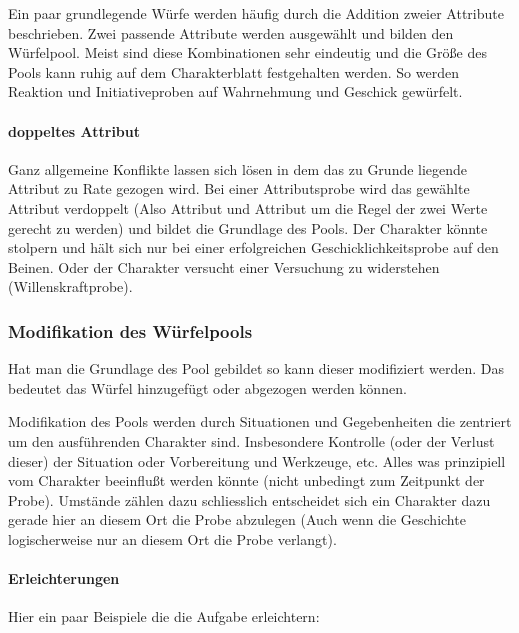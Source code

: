 \documentclass{article}
\begin{document}
Ein paar grundlegende Würfe werden häufig durch die Addition zweier Attribute beschrieben. Zwei passende Attribute
werden ausgewählt und bilden den Würfelpool. Meist sind diese Kombinationen sehr eindeutig und die Größe des Pools
kann ruhig auf dem Charakterblatt festgehalten werden. So werden Reaktion und Initiativeproben auf Wahrnehmung und
Geschick gewürfelt.

\paragraph{doppeltes Attribut}

Ganz allgemeine Konflikte lassen sich lösen in dem das zu Grunde liegende Attribut zu Rate gezogen wird. Bei einer
Attributsprobe wird das gewählte Attribut verdoppelt (Also Attribut und Attribut um die Regel der zwei Werte gerecht
zu werden) und bildet die Grundlage des Pools. Der Charakter könnte stolpern und hält sich nur bei einer erfolgreichen
Geschicklichkeitsprobe auf den Beinen. Oder der Charakter versucht einer Versuchung zu widerstehen (Willenskraftprobe).

\subsubsection{Modifikation des Würfelpools}

Hat man die Grundlage des Pool gebildet so kann dieser modifiziert werden. Das bedeutet das Würfel hinzugefügt oder
abgezogen werden können.

Modifikation des Pools werden durch Situationen und Gegebenheiten die zentriert um den ausführenden Charakter sind.
Insbesondere Kontrolle (oder der Verlust dieser) der Situation oder Vorbereitung und Werkzeuge, etc. Alles was
prinzipiell vom Charakter beeinflußt werden könnte (nicht unbedingt zum Zeitpunkt der Probe). Umstände zählen dazu
schliesslich entscheidet sich ein Charakter dazu gerade hier an diesem Ort die Probe abzulegen (Auch wenn die
Geschichte logischerweise nur an diesem Ort die Probe verlangt).

\paragraph{Erleichterungen}

Hier ein paar Beispiele die die Aufgabe erleichtern:
\end{document}
